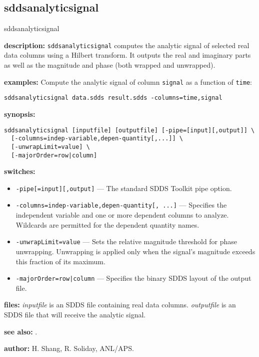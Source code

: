 \newpage
\subsection{sddsanalyticsignal}
\label{sddsanalyticsignal}

\begin{sddsprog}{sddsanalyticsignal}
\item \textbf{description:} \verb|sddsanalyticsignal| computes the analytic signal of selected real data columns using a Hilbert transform.  It outputs the real and imaginary parts as well as the magnitude and phase (both wrapped and unwrapped).
\item \textbf{examples:}
  Compute the analytic signal of column \verb|signal| as a function of \verb|time|:
  \begin{verbatim}
sddsanalyticsignal data.sdds result.sdds -columns=time,signal
  \end{verbatim}
\item \textbf{synopsis:}
  \begin{verbatim}
sddsanalyticsignal [inputfile] [outputfile] [-pipe=[input][,output]] \
  [-columns=indep-variable,depen-quantity[,...]] \
  [-unwrapLimit=value] \
  [-majorOrder=row|column]
  \end{verbatim}
\item \textbf{switches:}
  \begin{itemize}
  \item \verb|-pipe[=input][,output]| --- The standard SDDS Toolkit pipe option.
  \item \verb|-columns=indep-variable,depen-quantity[, ...]| --- Specifies the independent variable and one or more dependent columns to analyze.  Wildcards are permitted for the dependent quantity names.
  \item \verb|-unwrapLimit=value| --- Sets the relative magnitude threshold for phase unwrapping.  Unwrapping is applied only when the signal's magnitude exceeds this fraction of its maximum.
  \item \verb!-majorOrder=row|column! --- Specifies the binary SDDS layout of the output file.
  \end{itemize}
\item \textbf{files:} \emph{inputfile} is an SDDS file containing real data columns.  \emph{outputfile} is an SDDS file that will receive the analytic signal.
\item \textbf{see also:} \progref{sddsfft}.
\item \textbf{author:} H. Shang, R. Soliday, ANL/APS.
\end{sddsprog}

